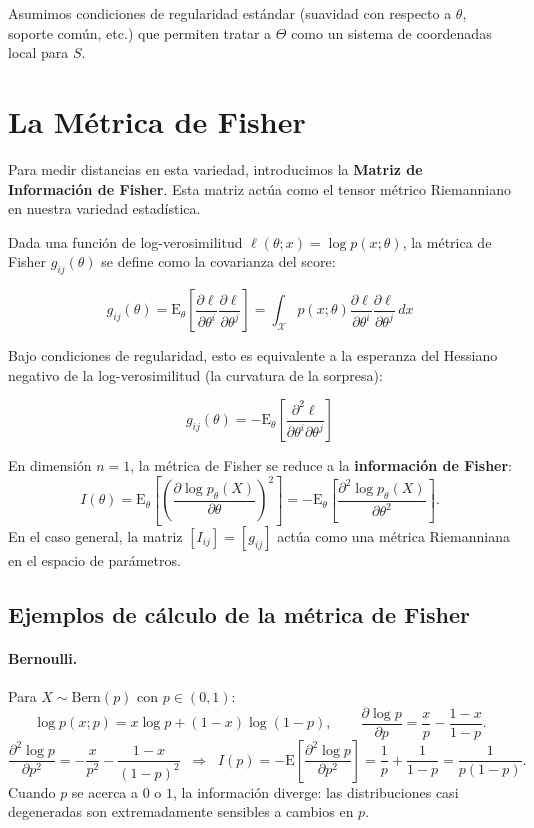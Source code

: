 Asumimos condiciones de regularidad estándar (suavidad con respecto a $\theta$, soporte común, etc.) que permiten tratar a $\Theta$ como un sistema de coordenadas local para $S$.

\section{La Métrica de Fisher}

Para medir distancias en esta variedad, introducimos la \textbf{Matriz de Información de Fisher}. Esta matriz actúa como el tensor métrico Riemanniano en nuestra variedad estadística.

Dada una función de log-verosimilitud $\ell(\theta; x) = \log p(x; \theta)$, la métrica de Fisher $g_{ij}(\theta)$ se define como la covarianza del score:

\[ g_{ij}(\theta) = \mathrm{E}_\theta \left[ \frac{\partial \ell}{\partial \theta^i} \frac{\partial \ell}{\partial \theta^j} \right] = \int_{\mathcal{X}} p(x; \theta) \frac{\partial \ell}{\partial \theta^i} \frac{\partial \ell}{\partial \theta^j} \, dx \]

Bajo condiciones de regularidad, esto es equivalente a la esperanza del Hessiano negativo de la log-verosimilitud (la curvatura de la sorpresa):

\[ g_{ij}(\theta) = -\mathrm{E}_\theta \left[ \frac{\partial^2 \ell}{\partial \theta^i \partial \theta^j} \right] \]

\begin{definition}
	En dimensión $n = 1$, la métrica de Fisher se reduce a la \textbf{información de Fisher}:
	\[
	I(\theta) = \mathrm{E}_\theta\!\left[\left(\frac{\partial \log p_\theta(X)}{\partial \theta}\right)^2\right] = -\mathrm{E}_\theta\!\left[\frac{\partial^2 \log p_\theta(X)}{\partial \theta^2}\right].
	\]
	En el caso general, la matriz $[I_{ij}] = [g_{ij}]$ actúa como una métrica Riemanniana en el espacio de parámetros.
\end{definition}

\subsection{Ejemplos de cálculo de la métrica de Fisher}

\paragraph{Bernoulli.} Para $X \sim \mathrm{Bern}(p)$ con $p \in (0,1)$:
\[
\log p(x;p) = x \log p + (1-x)\log(1-p), \qquad
\frac{\partial \log p}{\partial p} = \frac{x}{p} - \frac{1-x}{1-p}.
\]
\[
\frac{\partial^2 \log p}{\partial p^2} = -\frac{x}{p^2} - \frac{1-x}{(1-p)^2} \;\;\Longrightarrow\;\;
I(p) = -\mathrm{E}\!\left[\frac{\partial^2 \log p}{\partial p^2}\right] = \frac{1}{p} + \frac{1}{1-p} = \frac{1}{p(1-p)}.
\]
Cuando $p$ se acerca a $0$ o $1$, la información diverge: las distribuciones casi degeneradas son extremadamente sensibles a cambios en $p$.

